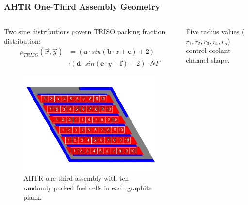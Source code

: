 \begin{frame}
    \frametitle{AHTR One-Third Assembly Geometry}
    \begin{columns}
        \begin{column}{0.5\textwidth}
            \vspace{0.1cm}
            Two sine distributions govern TRISO packing fraction distribution:
            \vspace{-0.2cm} 
            \begin{align}
            \rho_{TRISO}(\vec{x}, \vec{y}) &= \left(\textbf{a}\cdot sin(\textbf{b}\cdot 
            x + \textbf{c}) + 2\right) \nonumber \\
            & \cdot \left(\textbf{d}\cdot sin(\textbf{e}\cdot y + \textbf{f}) + 2\right) 
            \cdot NF \nonumber
            \end{align}
            \vspace{-0.7cm}
            \begin{figure}
                \includegraphics[width=\linewidth]{../docs/figures/ahtr_assembly.png} 
                \caption{AHTR one-third assembly with ten randomly packed fuel cells in 
                each graphite plank.}
            \end{figure}
        \end{column}
        \begin{column}{0.5\textwidth} 
            Five radius values (\textbf{$r_1, r_2, r_3, r_4, r_5$}) control coolant channel shape.
            \begin{figure}

\end{figure}
\end{column}
\end{columns}
\end{frame}
